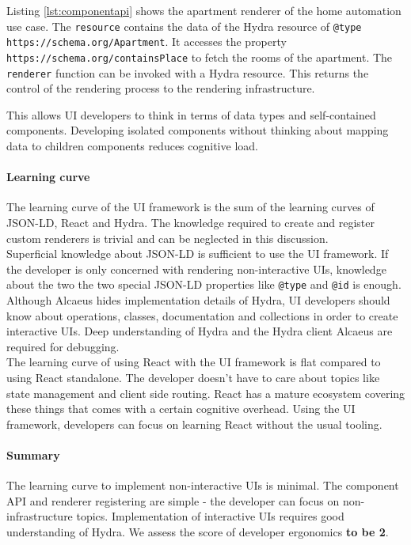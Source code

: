 Listing \ref{lst:componentapi} shows the apartment renderer of the home automation use case. The \lstinline{resource} contains the data of the Hydra resource of \lstinline{@type} \lstinline{https://schema.org/Apartment}. It accesses the property \lstinline{https://schema.org/containsPlace} to fetch the rooms of the apartment. The \lstinline{renderer} function can be invoked with a Hydra resource. This returns the control of the rendering process to the rendering infrastructure.

This allows UI developers to think in terms of data types and self-contained components. Developing isolated components without thinking about mapping data to children components reduces \gls{cognitive load}.

\paragraph{Learning curve}
The learning curve of the UI framework is the sum of the learning curves of JSON-LD, React and Hydra. The knowledge required to create and register custom renderers is trivial and can be neglected in this discussion. \\
Superficial knowledge about JSON-LD is sufficient to use the UI framework. If the developer is only concerned with rendering non-interactive UIs, knowledge about the two the two special JSON-LD properties like \lstinline{@type} and \lstinline{@id} is enough. \\
Although Alcaeus hides implementation details of Hydra, UI developers should know about operations, classes, documentation and collections in order to create interactive UIs. Deep understanding of Hydra and the Hydra client Alcaeus are required for debugging. \\
The learning curve of using React with the UI framework is flat compared to using React standalone. The developer doesn't have to care about topics like state management and client side routing. React has a mature ecosystem covering these things that comes with a certain cognitive overhead. Using the UI framework, developers can focus on learning React without the usual tooling.

\paragraph{Summary}
The learning curve to implement non-interactive UIs is minimal. The component API and renderer registering are simple - the developer can focus on non-infrastructure topics. Implementation of interactive UIs requires good understanding of Hydra. We assess the score of developer ergonomics \textbf{to be 2}.

